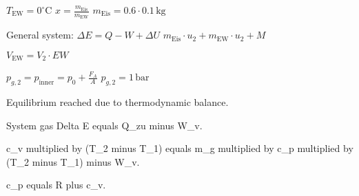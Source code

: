 \( T_{\text{EW}} = 0^\circ \text{C} \)  
\( x = \frac{m_{\text{Eis}}}{m_{\text{EW}}} \)  
\( m_{\text{Eis}} = 0.6 \cdot 0.1 \, \text{kg} \)  

General system:  
\( \Delta E = Q - W + \Delta U \)  
\( m_{\text{Eis}} \cdot u_2 + m_{\text{EW}} \cdot u_2 + M \)  

\( V_{\text{EW}} = V_2 \cdot EW \)  

\( p_{g,2} = p_{\text{inner}} = p_0 + \frac{F_A}{A} \)  
\( p_{g,2} = 1 \, \text{bar} \)  

Equilibrium reached due to thermodynamic balance.

System gas  
Delta E equals Q_zu minus W_v.  

c_v multiplied by (T_2 minus T_1) equals m_g multiplied by c_p multiplied by (T_2 minus T_1) minus W_v.  

c_p equals R plus c_v.